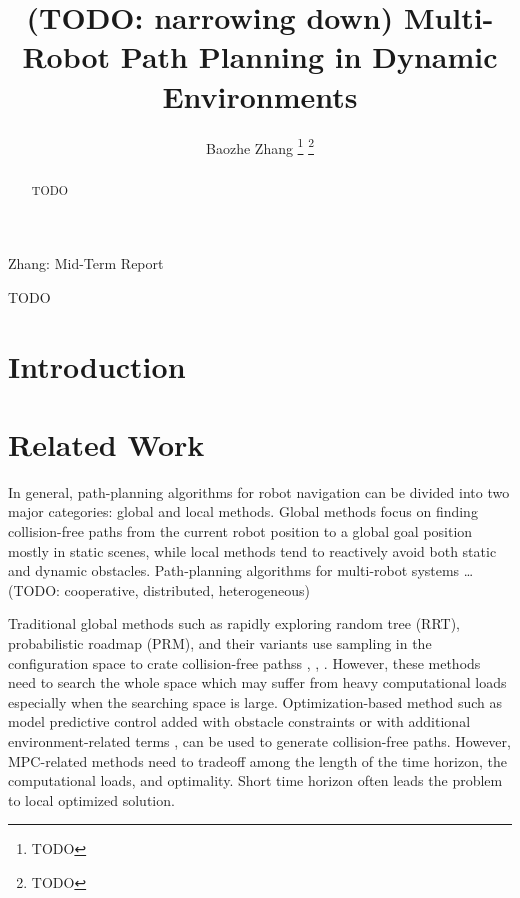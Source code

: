\documentclass[letterpaper,journal]{IEEEtran}
\begin{document}
\title{(TODO: narrowing down) Multi-Robot Path Planning in Dynamic Environments}

\author{Baozhe Zhang
\thanks{TODO}%
\thanks{TODO}}

%
{Zhang: Mid-Term Report}


\maketitle

\begin{abstract}
TODO
\end{abstract}

\begin{IEEEkeywords}
  TODO
\end{IEEEkeywords}

\section{Introduction}

\section{Related Work}

In general, path-planning algorithms for robot navigation can be divided into two major categories: global and local methods.
Global methods focus on finding collision-free paths from the current robot position to a global goal position mostly in static scenes, while local methods tend to reactively avoid both static and dynamic obstacles. 
Path-planning algorithms for multi-robot systems \dots (TODO: cooperative, distributed, heterogeneous)

Traditional global methods such as rapidly exploring random tree (RRT), probabilistic roadmap (PRM), and their variants use sampling in the configuration space to crate collision-free pathss \cite{lavalle2001rapidly}, \cite{karaman2011sampling}, \cite{kavraki1996probabilistic}. 
However, these methods need to search the whole space which may suffer from heavy computational loads especially when the searching space is large.  
Optimization-based method such as model predictive control added with obstacle constraints or with additional environment-related terms \cite{park2009obstacle}, \cite{ji2016path}  can be used to generate collision-free paths. 
However, MPC-related methods need to tradeoff among the length of the time horizon, the computational loads, and optimality. Short time horizon often leads the problem to local optimized solution.



\end{document}
